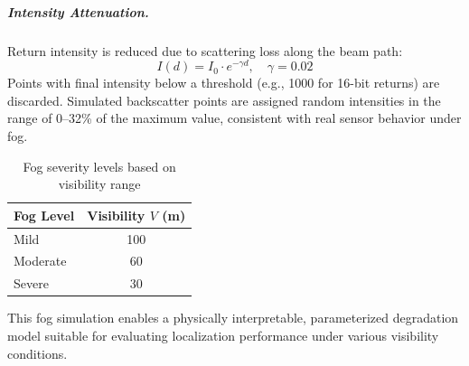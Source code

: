 \subparagraph{Intensity Attenuation.}
Return intensity is reduced due to scattering loss along the beam path:
\[
I(d) = I_0 \cdot e^{-\gamma d}, \quad \gamma = 0.02
\]
Points with final intensity below a threshold (e.g., 1000 for 16-bit returns) are discarded. Simulated backscatter points are assigned random intensities in the range of 0--32\% of the maximum value, consistent with real sensor behavior under fog.

\begin{table}[H]
	\centering
	\caption{Fog severity levels based on visibility range}
	\label{tab:noise_levels}
	\begin{tabular}{lc}
		\toprule
		\textbf{Fog Level} & \textbf{Visibility \( V \) (m)} \\
		\midrule
		Mild      & 100 \\
		Moderate  & 60  \\
		Severe    & 30  \\
		\bottomrule
	\end{tabular}
\end{table}

This fog simulation enables a physically interpretable, parameterized degradation model suitable for evaluating localization performance under various visibility conditions.



